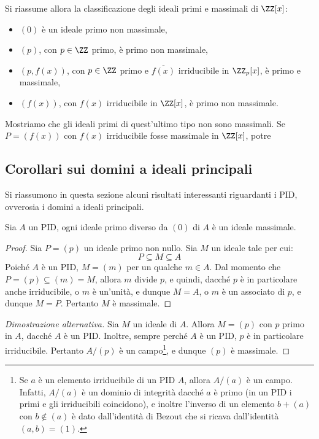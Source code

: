 \documentclass[11pt]{scrartcl}
\begin{document}
	Si riassume allora la classificazione degli ideali primi e massimali di $\ZZ[x]$:
	\begin{itemize}
		\item $(0)$ è un ideale primo non massimale,
		\item $(p)$, con $p \in \ZZ$ primo, è primo non massimale,
		\item $(p, f(x))$, con $p \in \ZZ$ primo e $\overline{f(x)}$ irriducibile
		in $\ZZ_p[x]$, è primo e massimale,
		\item $(f(x))$, con $f(x)$ irriducibile in $\ZZ[x]$, è primo non massimale.
	\end{itemize}
	
	
	
	Mostriamo che gli ideali primi di quest'ultimo tipo non sono massimali.
	Se $P = (f(x))$ con $f(x)$ irriducibile fosse massimale in $\ZZ[x]$, potre
	
	\newpage
	
	\subsection{Corollari sui domini a ideali principali}
	
	Si riassumono in questa sezione alcuni risultati interessanti riguardanti
	i PID, ovverosia i domini a ideali principali.
	
	\begin{proposition}
		\label{prop:pid_ideali}
		Sia $A$ un PID, ogni ideale primo diverso da $(0)$ di $A$ è un ideale 
		massimale.
	\end{proposition}
	
	\begin{proof}
		Sia $P = (p)$ un ideale primo non nullo. Sia
		$M$ un ideale tale per cui:
		\[
		P \subseteq M \subseteq A
		\]
		Poiché $A$ è un PID, $M = (m)$ per un qualche $m \in A$. Dal momento che
		$P = (p) \subseteq (m) = M$, allora $m$ divide $p$, e quindi, dacché
		$p$ è in particolare anche irriducibile, o $m$ è
		un'unità, e dunque $M = A$, o $m$ è un associato di $p$, e dunque $M = P$.
		Pertanto $M$ è massimale.
	\end{proof}
	
	\begin{proof}[Dimostrazione alternativa]
		Sia $M$ un ideale di $A$. Allora $M = (p)$ con $p$ primo in $A$, dacché
		$A$ è un PID. Inoltre, sempre perché $A$ è un PID, $p$
		è in particolare irriducibile. Pertanto $A/(p)$ è un campo\footnote{
			Se $a$ è un elemento irriducibile di un PID $A$, allora
			$A/(a)$ è un campo. Infatti, $A/(a)$ è un dominio di integrità
			dacché $a$ è primo (in un PID i primi e gli irriducibili coincidono),
			e inoltre l'inverso di un elemento $b + (a)$ con $b \notin (a)$ è dato dall'identità
			di Bezout che si ricava dall'identità $(a, b) = (1)$.
		}, e dunque
		$(p)$ è massimale.
	\end{proof}
	
\end{document}
